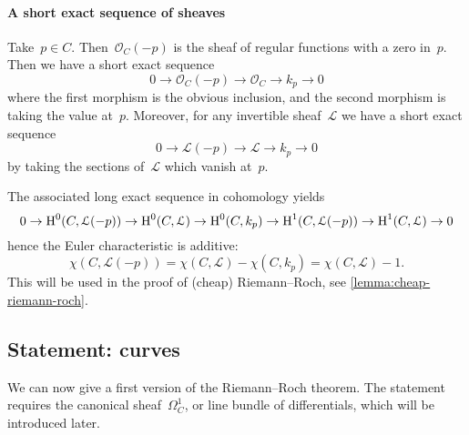 \documentclass[10pt,a4paper]{article}
\begin{document}
\paragraph{A short exact sequence of sheaves}
Take~$p\in C$. Then~$\mathcal{O}_C(-p)$ is the sheaf of regular functions with a zero in~$p$. Then we have a short exact sequence
\begin{equation}
  0\to\mathcal{O}_C(-p)\to\mathcal{O}_C\to k_p\to 0
\end{equation}
where the first morphism is the obvious inclusion, and the second morphism is taking the value at~$p$. Moreover, for any invertible sheaf~$\mathcal{L}$ we have a short exact sequence
\begin{equation}
  0\to\mathcal{L}(-p)\to\mathcal{L}\to k_p\to 0
\end{equation}
by taking the sections of~$\mathcal{L}$ which vanish at~$p$.

The associated long exact sequence in cohomology yields
\begin{equation}
  0\to\operatorname{H}^0(C,\mathcal{L}(-p))\to\operatorname{H}^0(C,\mathcal{L})\to\operatorname{H}^0(C,k_p)\to\operatorname{H}^1(C,\mathcal{L}(-p))\to\operatorname{H}^1(C,\mathcal{L})\to 0
\end{equation}
hence the Euler characteristic is additive:
\begin{equation}
  \chi(C,\mathcal{L}(-p))=\chi(C,\mathcal{L})-\chi(C,k_p)=\chi(C,\mathcal{L})-1.
\end{equation}
This will be used in the proof of (cheap) Riemann--Roch, see \cref{lemma:cheap-riemann-roch}.

\subsection{Statement: curves}
\label{subsection:statement-curves}
We can now give a first version of the Riemann--Roch theorem. The statement requires the canonical sheaf~$\Omega_C^1$, or line bundle of differentials, which will be introduced later.
\end{document}
